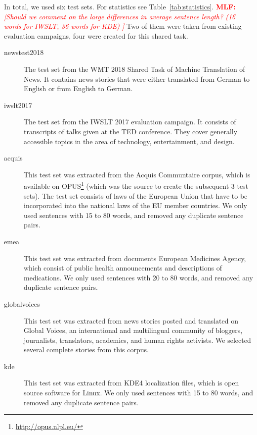 \documentclass[11pt,a4paper]{article}
\newcommand{\todomlf}[1] {\textcolor{red}{\textbf{MLF:} \em [#1]}\marginpar{\textcolor{red}{\Large \textbf{!!!}}}}
\begin{document}
In total, we used six test sets. For statistics see Table~\ref{tab:statistics}. \todomlf{Should we comment on the large differences in average sentence length? (16 words for IWSLT, 36 words for KDE) } Two of them were taken from existing evaluation campaigns, four were created for this shared task.
\begin{description}
    \item[\sc newstest2018] The test set from the WMT 2018 Shared Task of Machine Translation of News. It contains news stories that were either translated from German to English or from English to German.
    \item[\sc iwslt2017] The test set from the IWSLT 2017 evaluation campaign. It consists of transcripts of talks given at the TED conference. They cover generally accessible topics in the area of technology, entertainment, and design.
    \item[\sc acquis] This test set was extracted from the Acquis Communtaire corpus, which is available on OPUS\footnote{\url{http://opus.nlpl.eu/}} \citep{TIEDEMANN12.463} (which was the source to create the subsequent 3 test sets). The test set consists of laws of the European Union that have to be incorporated into the national laws of the EU member countries. We only used sentences with 15 to 80 words, and removed any duplicate sentence pairs.
    \item[\sc emea] This test set was extracted from documents European Medicines Agency, which consist of public health announcements and descriptions of medications. We only used sentences with 20 to 80 words, and removed any duplicate sentence pairs.
    \item[\sc globalvoices] This test set was extracted from news stories posted and translated on Global Voices, an international and multilingual community of bloggers, journalists, translators, academics, and human rights activists. We selected several complete stories from this corpus.
    \item[\sc kde] This test set was extracted from KDE4 localization files, which is open source software for Linux. We only used sentences with 15 to 80 words, and removed any duplicate sentence pairs.
\end{description}
\end{document}
